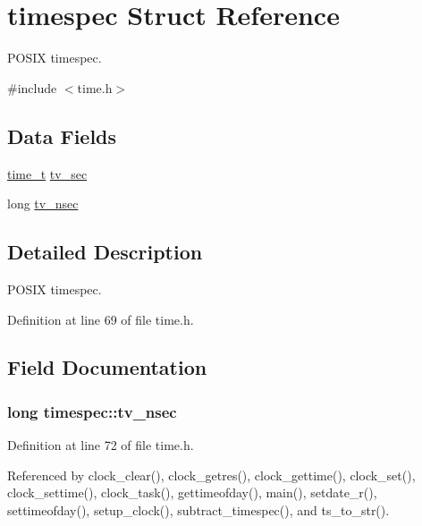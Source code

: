 \hypertarget{structtimespec}{\section{timespec Struct Reference}
\label{structtimespec}
}


P\-O\-S\-I\-X timespec.  




{\ttfamily \#include $<$time.\-h$>$}

\subsection*{Data Fields}
\begin{DoxyCompactItemize}
\item 
\hyperlink{posix_8h_a3346b04b0420b32ccf6b706551b70762}{time\-\_\-t} \hyperlink{structtimespec_afc3302668d7cb5952f590da69fdd4955}{tv\-\_\-sec}
\item 
long \hyperlink{structtimespec_ae3c7510dafa8cbcaede866ed13c99683}{tv\-\_\-nsec}
\end{DoxyCompactItemize}


\subsection{Detailed Description}
P\-O\-S\-I\-X timespec. 

Definition at line 69 of file time.\-h.



\subsection{Field Documentation}
\hypertarget{structtimespec_ae3c7510dafa8cbcaede866ed13c99683}{
\subsubsection[{tv\-\_\-nsec}]{\setlength{\rightskip}{0pt plus 5cm}long timespec\-::tv\-\_\-nsec}}\label{structtimespec_ae3c7510dafa8cbcaede866ed13c99683}


Definition at line 72 of file time.\-h.



Referenced by clock\-\_\-clear(), clock\-\_\-getres(), clock\-\_\-gettime(), clock\-\_\-set(), clock\-\_\-settime(), clock\-\_\-task(), gettimeofday(), main(), setdate\-\_\-r(), settimeofday(), setup\-\_\-clock(), subtract\-\_\-timespec(), and ts\-\_\-to\-\_\-str().

